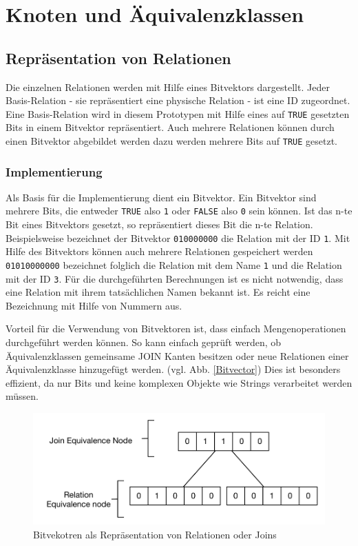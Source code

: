 \section{Knoten und Äquivalenzklassen}

\subsection{Repräsentation von Relationen}
\label{sec:Bitvector}

Die einzelnen Relationen werden mit Hilfe eines Bitvektors dargestellt. Jeder Basis-Relation - sie repräsentiert eine physische Relation - ist eine ID zugeordnet. Eine Basis-Relation wird in diesem Prototypen mit Hilfe eines auf \texttt{TRUE} gesetzten Bits in einem Bitvektor repräsentiert. Auch mehrere Relationen können durch einen Bitvektor abgebildet werden dazu werden mehrere Bits auf \texttt{TRUE} gesetzt.

\subsubsection{Implementierung}

Als Basis für die Implementierung dient ein Bitvektor. Ein Bitvektor sind mehrere Bits, die entweder \texttt{TRUE} also \texttt{1} oder \texttt{FALSE} also \texttt{0} sein können. Ist das n-te Bit eines Bitvektors gesetzt, so repräsentiert dieses Bit die n-te Relation. Beispielsweise bezeichnet der Bitvektor \texttt{010000000} die Relation mit der ID \texttt{1}. Mit Hilfe des Bitvektors können auch mehrere Relationen gespeichert werden \texttt{01010000000} bezeichnet folglich die Relation mit dem Name \texttt{1} und die Relation mit der ID \texttt{3}. Für die durchgeführten Berechnungen ist es nicht notwendig, dass eine Relation mit ihrem tatsächlichen Namen bekannt ist. Es reicht eine Bezeichnung mit Hilfe von Nummern aus.

Vorteil für die Verwendung von Bitvektoren ist, dass einfach Mengenoperationen durchgeführt werden können. So kann einfach geprüft werden, ob Äquivalenzklassen gemeinsame JOIN Kanten besitzen oder neue Relationen einer Äquivalenzklasse hinzugefügt werden. (vgl. Abb. \ref{Bitvector}) Dies ist besonders effizient, da nur Bits und keine komplexen Objekte wie Strings verarbeitet werden müssen.



\begin{figure}[ht]
  \centering
  \includegraphics{04_Implementierung/00_media/Bitvector.pdf}
  \caption{Bitvekotren als Repräsentation von Relationen oder Joins}
  \label{Bitvektor}
\end{figure}


